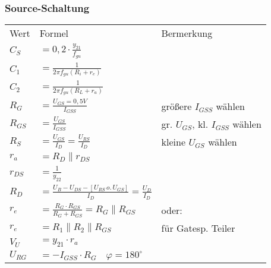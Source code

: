     \subsubsection{Source-Schaltung}
        \begin{minipage}{0.5\columnwidth}
            \renewcommand{\arraystretch}{1.01}
            \begin{table}[H]
                \begin{tabularx}{\columnwidth}{l l l}
                    Wert     & Formel                                                           & Bermerkung\\
                    $C_S$    & $=0,2\cdot\frac{y_{21}}{f_{gu}}$                                 & \\ %
                    $C_1$    & $=\frac{1}{2\pi f_{gu}(R_i+r_e)}$                                & \\
                    $C_2$    & $=\frac{1}{2\pi f_{gu}(R_L+r_a)}$                                & \\
                    $R_G$    & $=\frac{U_{GS}=0,5V}{I_{GSS}}$                                   & größere $I_{GSS}$ wählen \\
                    $R_{GS}$ & $=\frac{U_{GS}}{I_{GSS}}$                                        & gr. $U_{GS}$, kl. $I_{GSS}$ wählen \\
                    $R_S$    & $=\frac{U_{GS}}{I_D}=\frac{U_{RS}}{I_D}$                         & kleine $U_{GS}$ wählen \\
                    $r_a$    & $=R_D\parallel r_{DS}$                                           & \\
                    $r_{DS}$ & $=\frac{1}{y_{22}}$                                              & \\
                    $R_D$    & $=\frac{U_B-U_{DS}-[U_{RS}\, o.\, U_{GS}]}{I_D}=\frac{U_D}{I_D}$ & \\
                    $r_e$    & $=\frac{R_G\cdot R_{GS}}{R_G+R_{GS}}=R_G\parallel R_{GS}$        & oder:\\
                    $r_e$    & $=R_1\parallel R_2\parallel R_{GS}$                              & für Gatesp. Teiler \\
                    $V_U$    & $=y_{21}\cdot r_a$                                               & \\
                    $U_{RG}$ & $=-I_{GSS}\cdot R_G\quad\varphi=180^{\circ}$                     & \\ %
                \end{tabularx}
            \end{table}
        \end{minipage}
        \begin{minipage}{0.5\columnwidth}
            \vspace*{0.5cm}
        \end{minipage}
